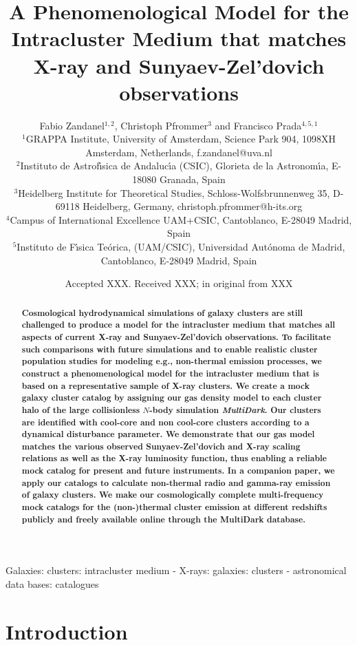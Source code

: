 \documentclass[useAMS,usenatbib]{mn2e}
\title[A Phenomenological Model for the Intracluster Medium]{A Phenomenological Model for the Intracluster Medium that matches X-ray and Sunyaev-Zel'dovich observations}
\author[F. Zandanel, C. Pfrommer and F. Prada]{
Fabio Zandanel$^{1,2}$, Christoph Pfrommer$^{3}$ and Francisco Prada$^{4,5,1}$\\
$^{1}$GRAPPA Institute, University of Amsterdam, Science Park 904, 1098XH Amsterdam, Netherlands, f.zandanel@uva.nl\\
$^{2}$Instituto de Astrof\'{\i}sica de Andaluc\'{\i}a (CSIC), Glorieta de la Astronom\'{\i}a, E-18080 Granada, Spain\\
$^{3}$Heidelberg Institute for Theoretical Studies, Schloss-Wolfsbrunnenweg 35, D-69118 Heidelberg, Germany, christoph.pfrommer@h-its.org\\
$^{4}$Campus of International Excellence UAM+CSIC, Cantoblanco, E-28049 Madrid, Spain\\
$^{5}$Instituto de F\'{\i}sica Te\'orica, (UAM/CSIC), Universidad Aut\'onoma de Madrid, Cantoblanco, E-28049 Madrid, Spain}
\begin{document}
\date{Accepted XXX. Received XXX; in original from XXX}

\pagerange{\pageref{firstpage}--\pageref{lastpage}} 

\maketitle

\label{firstpage}

\begin{abstract}
  {\bf Cosmological hydrodynamical simulations of galaxy clusters are still
    challenged to produce a model for the intracluster medium that matches all
    aspects of current X-ray and Sunyaev-Zel'dovich observations. To facilitate
    such comparisons with future simulations and to enable realistic cluster
    population studies for modeling e.g., non-thermal emission processes, we
    construct a phenomenological model for the intracluster medium that is based
    on a representative sample of X-ray clusters. We create a mock galaxy
    cluster catalog by assigning our gas density model to each cluster halo of
    the large collisionless $N$-body simulation {\em MultiDark}. Our clusters
    are identified with cool-core and non cool-core clusters according to a
    dynamical disturbance parameter. We demonstrate that our gas model matches
    the various observed Sunyaev-Zel'dovich and X-ray scaling relations as well
    as the X-ray luminosity function, thus enabling a reliable mock catalog for
    present and future instruments.  In a companion paper, we apply our catalogs
    to calculate non-thermal radio and gamma-ray emission of galaxy clusters. We
    make our cosmologically complete multi-frequency mock catalogs for the
    (non-)thermal cluster emission at different redshifts publicly and freely
    available online through the MultiDark database.}
\end{abstract}

\begin{keywords}
  Galaxies: clusters: intracluster medium - X-rays: galaxies: clusters - astronomical data bases: catalogues
\end{keywords}


\section{Introduction}
\label{sec:1}
\end{document}

